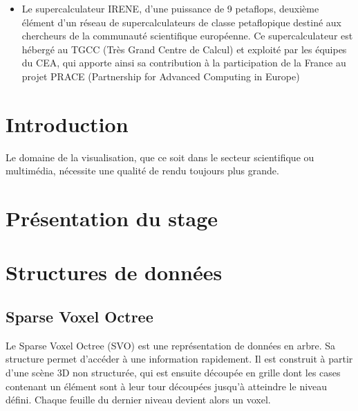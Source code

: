 \documentclass[12pt,a4paper,twoside]{article}
\begin{document}
\begin{itemize}[label=\textbullet]
        \item
        Le supercalculateur IRENE, d’une puissance de 9 petaflops, deuxième élément d’un réseau de supercalculateurs de classe petaflopique destiné aux chercheurs de la communauté scientifique européenne. Ce supercalculateur est hébergé au TGCC (Très Grand Centre de Calcul) et exploité par les équipes du CEA, qui apporte ainsi sa contribution à la participation de la France au projet PRACE (Partnership for Advanced Computing in Europe)

    \end{itemize}



    \newpage


    \section{Introduction}                          %

    Le domaine de la visualisation, que ce soit dans le secteur scientifique ou multimédia, nécessite une qualité de rendu toujours plus grande.


    \newpage
    \section{Présentation du stage}                 %


    \newpage
    \section{Structures de données}                 %
    \subsection{Sparse Voxel Octree}

    Le Sparse Voxel Octree (SVO) est une représentation de données en arbre. Sa structure permet d'accéder à une information rapidement.
    Il est construit à partir d'une scène 3D non structurée, qui est ensuite découpée en grille dont les cases contenant un élément sont à leur tour découpées jusqu'à atteindre le niveau défini.
    Chaque feuille du dernier niveau devient alors un voxel.

    \begin{figure}[H]
    \end{figure}
\end{document}
